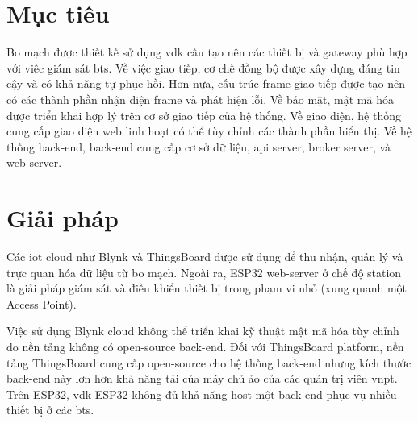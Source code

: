 \section{Mục tiêu}

Bo mạch được thiết kế sử dụng \acrfull{vdk} cấu tạo nên các thiết bị và gateway phù hợp với viêc giám sát \acrshort{bts}. Về việc giao tiếp, cơ chế đồng bộ được xây dựng đáng tin cậy và có khả năng tự phục hồi. Hơn nữa, cấu trúc frame giao tiếp được tạo nên có các thành phần nhận diện frame và phát hiện lỗi. Về bảo mật, mật mã hóa được triển khai hợp lý trên cơ sở giao tiếp của hệ thống. Về giao diện, hệ thống cung cấp giao diện web linh hoạt có thể tùy chỉnh các thành phần hiển thị. Về hệ thống back-end, back-end cung cấp cơ sở dữ liệu, \acrshort{api} server, broker server, và web-server.

\section{Giải pháp}

Các \acrshort{iot} cloud như Blynk và ThingsBoard được sử dụng để thu nhận, quản lý và trực quan hóa dữ liệu từ bo mạch. Ngoài ra, ESP32 web-server ở chế độ station là giải pháp giám sát và điều khiển thiết bị trong phạm vi nhỏ (xung quanh một Access Point).

Việc sử dụng Blynk cloud không thể triển khai kỹ thuật mật mã hóa tùy chỉnh do nền tảng không có open-source back-end. Đối với ThingsBoard platform, nền tảng ThingsBoard cung cấp open-source cho hệ thống back-end nhưng kích thước back-end này lơn hơn khả năng tải của máy chủ ảo của các quản trị viên \acrshort{vnpt}. Trên ESP32, \acrshort{vdk} ESP32 không đủ khả năng host một back-end phục vụ nhiều thiết bị ở các \acrshort{bts}.

